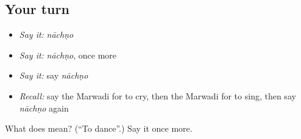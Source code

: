 \subsection*{Your turn}
\begin{itemize}
\raggedright
  \item \emph{Say it:} \emph{nāchṇo}
  \item \emph{Say it:} \emph{nāchṇo}, once more
  \item \emph{Say it:} say \emph{nāchṇo}
  \item \emph{Recall:} say the Marwadi for to cry, then the Marwadi for to sing, then say \emph{nāchṇo} again
\end{itemize}

\begin{tcolorbox}[breakable,colback=teal!4,colframe=teal!35!black,title={Before you move on}]
What does  mean? (\textquotedblleft{}To dance\textquotedblright{}.) Say it once more.
\end{tcolorbox}
